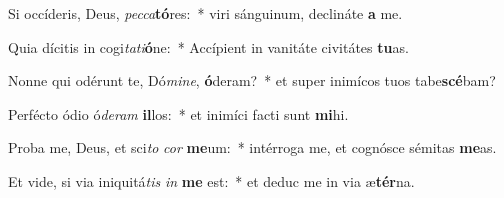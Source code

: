\item Si occíderis, Deus, \textit{pec}\textit{ca}\textbf{tó}res:~* viri sánguinum, declináte \textbf{a} me.
\item Quia dícitis in cogi\textit{ta}\textit{ti}\textbf{ó}ne:~* Accípient in vanitáte civitátes \textbf{tu}as.
\item Nonne qui odérunt te, Dó\textit{mi}\textit{ne}, \textbf{ó}deram?~* et super inimícos tuos tabe\textbf{scé}bam?
\item Perfécto ódio ó\textit{de}\textit{ram} \textbf{il}los:~* et inimíci facti sunt \textbf{mi}hi.
\item Proba me, Deus, et sci\textit{to} \textit{cor} \textbf{me}um:~* intérroga me, et cognósce sémitas \textbf{me}as.
\item Et vide, si via iniquitá\textit{tis} \textit{in} \textbf{me} est:~* et deduc me in via æ\textbf{tér}na.
